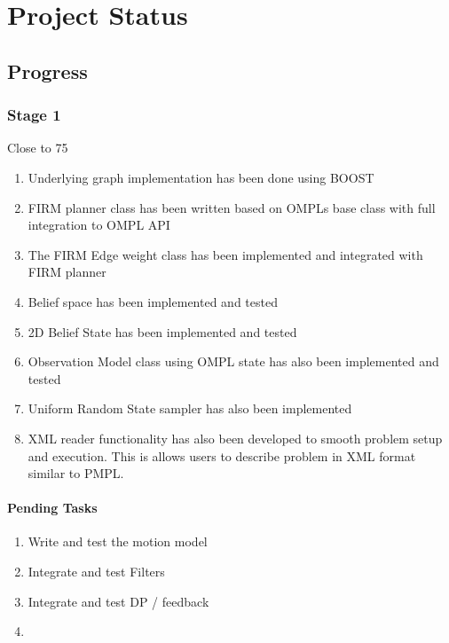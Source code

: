 \chapter{Project Status}

\section{Progress}

\subsection{Stage 1}

Close to 75
\begin{enumerate}
 \item Underlying graph implementation has been done using BOOST
 \item FIRM planner class has been written based on OMPLs base class with full integration to OMPL API
 \item The FIRM Edge weight class has been implemented and integrated with FIRM planner
 \item Belief space has been implemented and tested
 \item 2D Belief State has been implemented and tested
 \item Observation Model class using OMPL state has also been implemented and tested
 \item Uniform Random State sampler has also been implemented 
 \item XML reader functionality has also been developed to smooth problem setup and execution. 
	This is allows users to describe problem in XML format similar to PMPL.
\end{enumerate}

\subsubsection{Pending Tasks}
  
\begin{enumerate}
 \item Write and test the motion model
 \item Integrate and test Filters
 \item Integrate and test DP /  feedback
 \item 
\end{enumerate}
